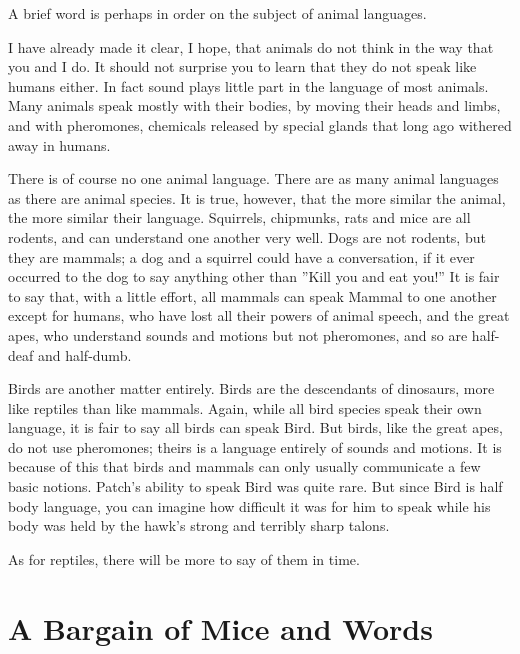 \documentclass[12pt]{book}
\begin{document}
 A brief word is perhaps in order on the subject of animal languages.\par
I have already made it clear, I hope, that animals do not think in the way that you and I do. It should not surprise you to learn that they do not speak like humans either. In fact sound plays little part in the language of most animals. Many animals speak mostly with their bodies, by moving their heads and limbs, and with pheromones, chemicals released by special glands that long ago withered away in humans.\par
 There is of course no one animal language. There are as many animal languages as there are animal species. It is true, however, that the more similar the animal, the more similar their language. Squirrels, chipmunks, rats and mice are all rodents, and can understand one another very well. Dogs are not rodents, but they are mammals; a dog and a squirrel could have a conversation, if it ever occurred to the dog to say anything other than ''Kill you and eat you!'' It is fair to say that, with a little effort, all mammals can speak Mammal to one another %
 except for humans, who have lost all their powers of animal speech, and the great apes, who understand sounds and motions but not pheromones, and so are half-deaf and half-dumb.\par
 Birds are another matter entirely. Birds are the descendants of dinosaurs, more like reptiles than like mammals. Again, while all bird species speak their own language, it is fair to say all birds can speak Bird. But birds, like the great apes, do not use pheromones; theirs is a language entirely of sounds and motions. It is because of this that birds and mammals can only usually communicate a few basic notions. Patch's ability to speak Bird was quite rare. But since Bird is half body language, you can imagine how difficult it was for him to speak while his body was held by the hawk's strong and terribly sharp talons.\par
 As for reptiles, there will be more to say of them in time.\par

\section{A Bargain of Mice and Words}
\end{document}
